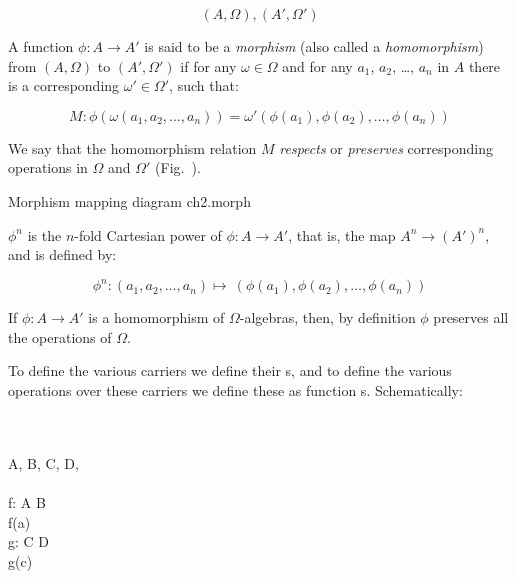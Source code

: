 \[ (A,\Omega),  (A',\Omega') \]

\noindent%
\begynd%
\pind%
A function $\phi: A\rightarrow A'$ is said to be 
      a \textsl{morphism}
%
      (also called a \textsl{homomorphism})
%
      from  $(A,\Omega)$ to $(A',\Omega')$ if for any 
      $\omega\in\Omega$ and for any $a_1$, $a_2$, \ldots,
      $a_n$ in $A$ there is a corresponding $\omega'\in\Omega'$,
      such that:
\afslut
\label{ch2.alg.morph.def}

      \[ M:  \phi(\omega(a_1,a_2,\ldots,a_n))
        =  \omega'(\phi(a_1),\phi(a_2),\ldots,\phi(a_n)) \]

\noindent
\begynd
\pind We say that the homomorphism relation $M$ 
      \textsl{respects}
%
%
      or \textsl{preserves} corresponding operations
      in $\Omega$ and $\Omega'$ (Fig.~). 
%
%

\newfoil
    
         {Morphism mapping diagram}
         {ch2.morph}
     
\pind $\phi^n$ is the $n$-fold Cartesian power of
      $\phi:A\rightarrow A'$, that is, the map
      $A^n\rightarrow (A')^n$, and is defined by:

\[ \phi^n: (a_1,a_2,\ldots,a_n) \mapsto\
        (\phi(a_1),\phi(a_2),\ldots,\phi(a_n))\]
 
\noindent
\pind If $\phi:A\rightarrow A'$ is a homomorphism of
      $\Omega$-algebras, then, by definition $\phi$
      preserves all the operations of $\Omega$. 
\afslut


\tbw


\begynd
\pind To define the various carriers we define their
      s, and 
\pind to define the various operations over these carriers
      we define these as function s.
\newfoil
\pind Schematically:
\afslut

\bp
{}\\
\>\\
\>\>A, B, C, D, {\DOTDOTDOT}\\
\>\\
\>\>f: A {\RIGHTARROW} B\\
\>\>f(a) {\IS} {\DOTDOTDOT}\\
\>\>g: C {\RIGHTARROW} D\\
\>\>g(c) {\IS} {\DOTDOTDOT}\\
\>\>{\DOTDOTDOT}\\
\ep

